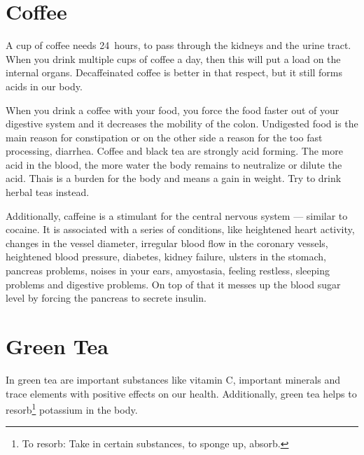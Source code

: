 \documentclass[../main.tex]{subfiles}
\begin{document}
\section{Coffee}

A cup of coffee needs \SI{24}{hours}, to pass through the kidneys and the urine tract.
When you drink multiple cups of coffee a day, then this will put a load on the internal organs.
Decaffeinated coffee is better in that respect, but it still forms acids in our body.

When you drink a coffee with your food, you force the food faster out of your digestive system
and it decreases the mobility of the colon. Undigested food is the main reason for constipation or on the other side a reason for the too fast processing, diarrhea.
Coffee and black tea are strongly acid forming.
The more acid in the blood, the more water the body remains to neutralize or dilute the acid.
Thais is a burden for the body and means a gain in weight.
Try to drink herbal teas instead.

Additionally, caffeine is a stimulant for the central nervous system --- similar to cocaine.
It is associated with a series of conditions, like heightened heart activity,
changes in the vessel diameter,
irregular blood flow in the coronary vessels,
heightened blood pressure,
diabetes,
kidney failure,
ulsters in the stomach,
pancreas problems,
noises in your ears,
amyostasia,
feeling restless,
sleeping problems and
digestive problems.
On top of that it messes up the blood sugar level by forcing the pancreas to secrete insulin.

\section{Green Tea}

In green tea are important substances like vitamin C, important minerals and trace elements with positive effects on our health.
Additionally, green tea helps to resorb\footnote{To resorb: Take in certain substances, to sponge up, absorb.} potassium in the body.
\end{document}
